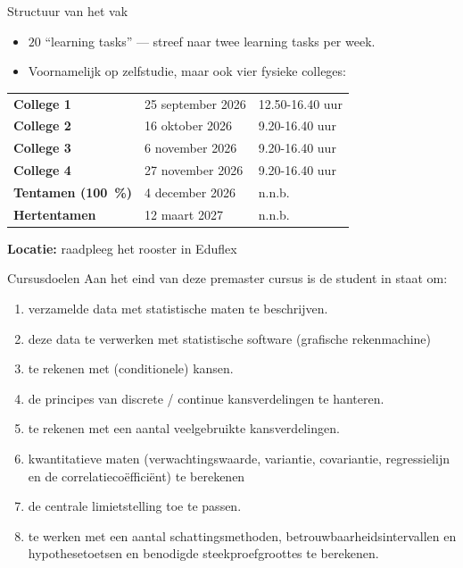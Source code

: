 \begin{frame}{Structuur van het vak}
    \begin{itemize}
        \item $20$ \enquote{learning tasks} --- streef naar twee learning tasks per week.
        \item Voornamelijk op zelfstudie, maar ook vier fysieke colleges:
    \end{itemize}
    \vfill
    \begin{center}
        \begin{tabular}{lll}
            \toprule
                \textbf{College 1} & 25 september 2026 & 12.50-16.40 uur \\
                \textbf{College 2} & 16 oktober 2026 & 9.20-16.40 uur \\
                \textbf{College 3} & 6 november 2026 & 9.20-16.40 uur\\
                \textbf{College 4} & 27 november 2026 & 9.20-16.40 uur \\
            \midrule
                \textbf{Tentamen (\SI{100}{\percent})} & 4 december 2026 & n.n.b. \\
                \textbf{Hertentamen} & 12 maart 2027 & n.n.b. \\
            \bottomrule
        \end{tabular}
    \end{center}
    \vfill
    \textbf{Locatie:} raadpleeg het rooster in Eduflex
\end{frame}

\begin{frame}{Cursusdoelen}
    Aan het eind van deze premaster cursus is de student in staat om:
    \begin{enumerate}
        \item verzamelde data met statistische maten te beschrijven.
        \item deze data te verwerken met statistische software (grafische rekenmachine)
        \item te rekenen met (conditionele) kansen.
        \item de principes van discrete / continue kansverdelingen te hanteren.
        \item te rekenen met een aantal veelgebruikte kansverdelingen.
        \item kwantitatieve maten (verwachtingswaarde, variantie, covariantie, regressielijn en de correlatiecoëfficiënt) te berekenen
        \item de centrale limietstelling toe te passen.
        \item te werken met een aantal schattingsmethoden, betrouwbaarheidsintervallen en hypothesetoetsen en benodigde steekproefgroottes te berekenen.
    \end{enumerate}
\end{frame}


